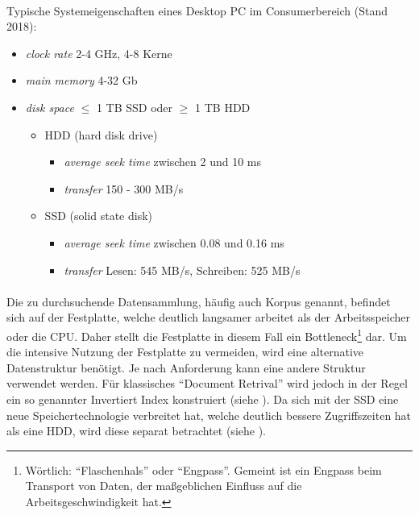 \paragraph{}
Typische Systemeigenschaften eines Desktop PC im Consumerbereich (Stand 2018):
\begin{itemize}
	\item \textit{clock rate} 2-4 GHz, 4-8 Kerne
	\item \textit{main memory} 4-32 Gb
	\item \textit{disk space} $\leq$ 1 TB SSD oder $\geq$ 1 TB HDD
	\begin{itemize}
	\item HDD (hard disk drive)
	\begin{itemize}
	\item \textit{average seek time} zwischen 2 und 10 ms
	\item \textit{transfer} 150 - 300 MB/s
	\end{itemize}
	\item SSD (solid state disk)
	\begin{itemize}
	\item \textit{average seek time} zwischen 0.08 und 0.16 ms
	\item \textit{transfer} Lesen: 545 MB/s, Schreiben: 525 MB/s
	\end{itemize}
	\end{itemize}
\end{itemize}	 
\par

\paragraph{}
Die zu durchsuchende Datensammlung, häufig auch Korpus genannt, befindet sich auf der Festplatte, welche deutlich langsamer arbeitet als der Arbeitsspeicher oder die CPU. Daher stellt die Festplatte in diesem Fall ein Bottleneck\footnote{Wörtlich: \enquote{Flaschenhals} oder \enquote{Engpass}. Gemeint ist ein Engpass beim Transport von Daten, der maßgeblichen Einfluss auf die Arbeitsgeschwindigkeit hat.} dar.
Um die intensive Nutzung der Festplatte zu vermeiden, wird eine alternative Datenstruktur benötigt. Je nach Anforderung kann eine andere Struktur verwendet werden. Für klassisches \enquote{Document Retrival} wird jedoch in der Regel ein so genannter Invertiert Index konstruiert (siehe ).
Da sich mit der SSD eine neue Speichertechnologie verbreitet hat, welche deutlich bessere Zugriffszeiten hat als eine HDD, wird diese separat betrachtet (siehe ).
\par

